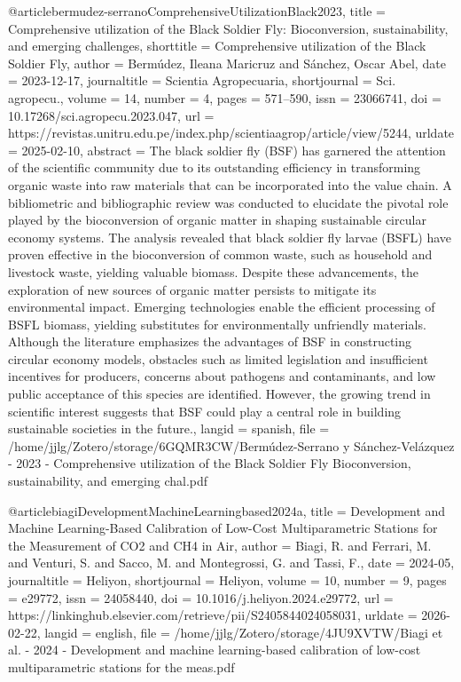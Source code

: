 {{{@article{bermudez-serranoComprehensiveUtilizationBlack2023,
  title = {Comprehensive utilization of the Black Soldier Fly: Bioconversion, sustainability, and emerging challenges},
  shorttitle = {Comprehensive utilization of the Black Soldier Fly},
  author = {Bermúdez, Ileana Maricruz and Sánchez, Oscar Abel},
  date = {2023-12-17},
  journaltitle = {Scientia Agropecuaria},
  shortjournal = {Sci. agropecu.},
  volume = {14},
  number = {4},
  pages = {571--590},
  issn = {23066741},
  doi = {10.17268/sci.agropecu.2023.047},
  url = {https://revistas.unitru.edu.pe/index.php/scientiaagrop/article/view/5244},
  urldate = {2025-02-10},
  abstract = {The black soldier fly (BSF) has garnered the attention of the scientific community due to its outstanding efficiency in transforming organic waste into raw materials that can be incorporated into the value chain. A bibliometric and bibliographic review was conducted to elucidate the pivotal role played by the bioconversion of organic matter in shaping sustainable circular economy systems. The analysis revealed that black soldier fly larvae (BSFL) have proven effective in the bioconversion of common waste, such as household and livestock waste, yielding valuable biomass. Despite these advancements, the exploration of new sources of organic matter persists to mitigate its environmental impact. Emerging technologies enable the efficient processing of BSFL biomass, yielding substitutes for environmentally unfriendly materials. Although the literature emphasizes the advantages of BSF in constructing circular economy models, obstacles such as limited legislation and insufficient incentives for producers, concerns about pathogens and contaminants, and low public acceptance of this species are identified. However, the growing trend in scientific interest suggests that BSF could play a central role in building sustainable societies in the future.},
  langid = {spanish},
  file = {/home/jjlg/Zotero/storage/6GQMR3CW/Bermúdez-Serrano y Sánchez-Velázquez - 2023 - Comprehensive utilization of the Black Soldier Fly Bioconversion, sustainability, and emerging chal.pdf}
}

@article{biagiDevelopmentMachineLearningbased2024a,
  title = {Development and Machine Learning-Based Calibration of Low-Cost Multiparametric Stations for the Measurement of {{CO2}} and {{CH4}} in Air},
  author = {Biagi, R. and Ferrari, M. and Venturi, S. and Sacco, M. and Montegrossi, G. and Tassi, F.},
  date = {2024-05},
  journaltitle = {Heliyon},
  shortjournal = {Heliyon},
  volume = {10},
  number = {9},
  pages = {e29772},
  issn = {24058440},
  doi = {10.1016/j.heliyon.2024.e29772},
  url = {https://linkinghub.elsevier.com/retrieve/pii/S2405844024058031},
  urldate = {2026-02-22},
  langid = {english},
  file = {/home/jjlg/Zotero/storage/4JU9XVTW/Biagi et al. - 2024 - Development and machine learning-based calibration of low-cost multiparametric stations for the meas.pdf}
}

}}}
